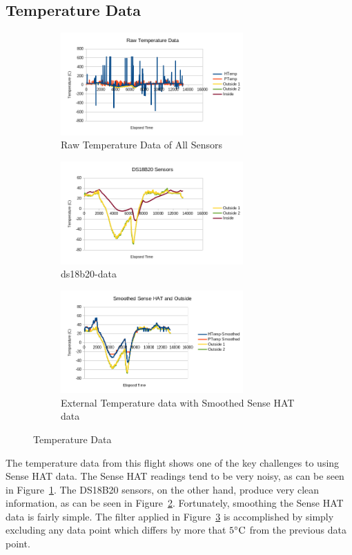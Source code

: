 \documentclass[journal]{new-aiaa}
\begin{document}
\subsection{Temperature Data}
\begin{figure}
    \centering
    \begin{subfigure}{0.45\textwidth}
        \includegraphics[width=2.75in]{images/rawtemp}
        \caption{Raw Temperature Data of All Sensors}
        \label{fig:rawtemp}
    \end{subfigure}
    \begin{subfigure}{0.45\textwidth}
        \includegraphics[width=2.75in]{images/ds18b20-data}
        \caption{ds18b20-data}
        \label{fig:ds18b20-temp}
    \end{subfigure}
    \begin{subfigure}{0.45\textwidth}
        \includegraphics[width=2.75in]{images/smoothtemp}
        \caption{External Temperature data with Smoothed Sense HAT data}
        \label{fig:smooth}
    \end{subfigure}
    \caption{Temperature Data}
    \label{fig:temperatureData}
\end{figure}

The temperature data from this flight shows one of the key challenges
to using Sense HAT data.  The Sense HAT readings tend to be very
noisy, as can be seen in Figure~\ref{fig:rawtemp}.  The DS18B20
sensors, on the other hand, produce very clean information, as can be
seen in Figure~\ref{fig:ds18b20-temp}.  Fortunately, smoothing the
Sense HAT data is fairly simple.  The filter applied in
Figure~\ref{fig:smooth} is accomplished by simply excluding any data
point which differs by more that $5\celsius$ from the previous data
point.  
\end{document}
